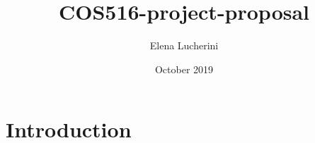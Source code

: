 \documentclass{article}
\title{COS516-project-proposal}
\author{Elena Lucherini}
\date{October 2019}
\begin{document}
\maketitle

\section{Introduction}
\end{document}
